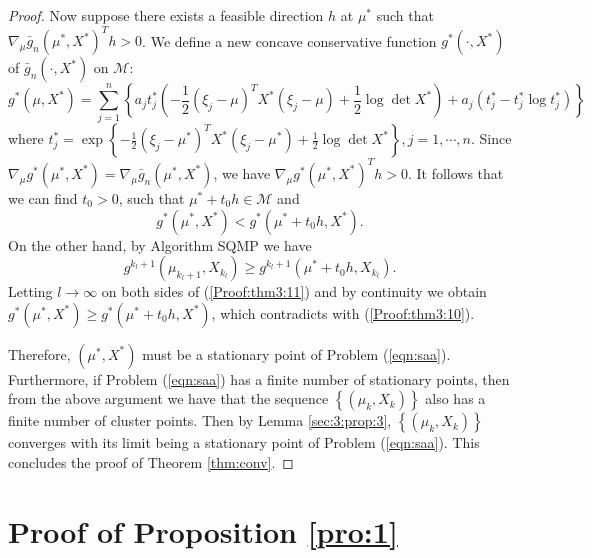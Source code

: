\begin{proof}
Now suppose there exists a feasible direction $h$ at $\mu^*$ such
that $\nabla_\mu \bar g_n(\mu^*,X^*)^Th>0$. We define a new concave
conservative function $g^*(\cdot,X^*)$ of $\bar g_n(\cdot,X^*)$ on
$\mathcal{M}$:
\begin{equation*}
g^*(\mu,X^*)=\sum_{j=1}^n
\left\{a_jt_j^*\left(-\frac{1}{2}(\xi_j-\mu)^TX^*(\xi_j-\mu)
+\frac{1}{2}\log\det X^*\right)+a_j\left(t_j^*-t_j^*\log
t_j^*\right)\right\}
\end{equation*}
where $t_j^*=\exp\left\{-\frac{1}{2}(\xi_j-\mu^*)^TX^*(\xi_j-\mu^*)+
\frac{1}{2}\log\det X^*\right\}, j=1,\cdots,n$. Since $\nabla_\mu
g^*(\mu^*,X^*)=\nabla_\mu \bar g_n(\mu^*,X^*)$, we have $\nabla_\mu
g^*(\mu^*,X^*)^Th>0$. It follows that we can find $t_0>0$, such that
$\mu^*+t_0h\in \mathcal{M}$ and
\begin{equation}\label{Proof:thm3:10}
g^*(\mu^*,X^*)<g^*(\mu^*+t_0h,X^*).
\end{equation}
On the other hand, by Algorithm SQMP we have
\begin{equation}\label{Proof:thm3:11}
g^{k_l+1}(\mu_{k_l+1},X_{k_l})\ge g^{k_l+1}(\mu^*+t_0h,X_{k_l}).
\end{equation}
Letting $l\to \infty$ on both sides of (\ref{Proof:thm3:11}) and by
continuity we obtain $g^*(\mu^*,X^*)\ge g^*(\mu^*+t_0h,X^*)$, which
contradicts with (\ref{Proof:thm3:10}).

Therefore, $(\mu^*,X^*)$ must be a stationary point of Problem
(\ref{eqn:saa}). Furthermore, if Problem (\ref{eqn:saa}) has a
finite number of stationary points, then from the above argument we
have that the sequence $\left\{(\mu_k,X_k)\right\}$ also has a
finite number of cluster points. Then by Lemma \ref{sec:3:prop:3},
$\left\{(\mu_k,X_k)\right\}$ converges with its limit being a
stationary point of Problem (\ref{eqn:saa}). This concludes the
proof of Theorem \ref{thm:conv}.
\end{proof}


\section{Proof of Proposition \ref{pro:1}}

